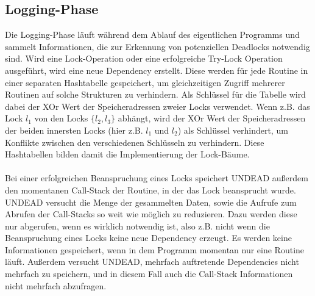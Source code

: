 \subsection{Logging-Phase}
Die Logging-Phase läuft während dem Ablauf des eigentlichen Programms und sammelt
Informationen, die zur Erkennung von potenziellen Deadlocks notwendig sind.  
Wird eine Lock-Operation
oder eine erfolgreiche Try-Lock Operation ausgeführt, wird eine neue Dependency 
erstellt. Diese werden für jede Routine in einer separaten 
Hashtabelle gespeichert, um gleichzeitigen Zugriff mehrerer Routinen auf solche 
Strukturen zu verhindern. Als Schlüssel für die Tabelle wird dabei der XOr 
Wert der Speicheradressen zweier Locks verwendet. Wenn z.B. das Lock $l_1$ 
von den Locks $\{l_2, l_3\}$ abhängt, wird der XOr Wert der Speicheradressen der 
beiden innersten Locks (hier z.B. $l_1$ und $l_2$) als Schlüssel verhindert, um 
Konflikte zwischen den verschiedenen Schlüsseln zu verhindern. Diese 
Hashtabellen bilden damit die Implementierung der Lock-Bäume.\\\\
Bei einer erfolgreichen Beanspruchung eines Locks speichert UNDEAD außerdem 
den momentanen Call-Stack der Routine, in der das Lock beansprucht wurde. 
UNDEAD versucht die Menge der gesammelten Daten, sowie die Aufrufe zum Abrufen
der Call-Stacks so weit wie möglich zu reduzieren.
Dazu werden diese nur abgerufen, wenn es wirklich notwendig ist, also z.B. 
nicht wenn die 
Beanspruchung eines Locks keine neue Dependency erzeugt. 
Es werden keine Informationen gespeichert, wenn in dem Programm momentan nur eine 
Routine läuft. Außerdem versucht UNDEAD, mehrfach auftretende
Dependencies nicht mehrfach zu speichern, und in diesem Fall auch die Call-Stack
Informationen nicht mehrfach abzufragen.
